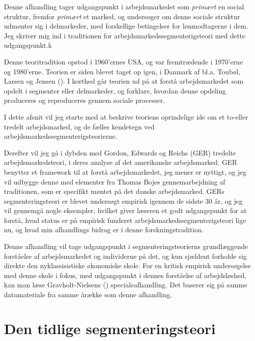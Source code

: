 Denne afhandling tager udgangspunkt i arbejdsmarkedet som \emph{primært} en social struktur, fremfor \emph{primært} et marked, og undersøger om denne sociale struktur udmønter sig i delmarkeder, med forskellige betingelser for lønmodtagerne i dem. Jeg skriver mig ind i traditionen for arbejdsmarkedssegmenterigsteori med dette udgangspunkt.k

Denne teoritradition opstod i 1960'ernes USA, og var fremtrædende i 1970'erne og 1980'erne. Teorien er siden blevet taget op igen, i Danmark af bl.a. Toubøl, Larsen og Jensen (\citeyear{Touboel2013}). I korthed går teorien ud på at forstå arbejdsmarkedet som opdelt i segmenter eller delmarkeder, og forklare, hvordan denne opdeling produceres og reproduceres gennem sociale processer.

I dette afsnit vil jeg starte med at beskrive teoriens oprindelige ide om et to-eller tredelt arbejdsmarked, og de fælles kendetegn ved arbejdsmarkedssegmenterigsteorierne.

Derefter vil jeg gå i dybden med Gordon, Edwards og Reichs (GER) tredelte arbejdsmarkedsteori, i deres analyse af det amerikanske arbejdsmarked. GER benytter et framework til at forstå arbejdsmarkedet, jeg mener er nyttigt, og jeg vil udbygge denne med elementer fra Thomas Bojes gennemarbejdning af traditionen, som er specifikt møntet på det danske arbejdsmarked.
GERs segmenteringsteori er blevet undersøgt empirisk igennem de sidste 30 år, og jeg vil gennemgå nogle eksempler,  hvilket giver læseren et godt udgangspunkt for at forstå, hvad status er på empirisk funderet arbejdsmarkedssegmenterigsteori lige nu, og hvad min afhandlings bidrag er i denne forskningstradition. 

Denne afhandling vil tage udgangspunkt i segmenteringsteorierns grundlæggende forståelse af  arbejdsmarkedet og individerne på det, og kun sjældent forholde sig direkte den nyklassisistiske økonomiske skole. For en kritisk empirisk undersøgelse med denne skole i fokus, med udgangspunkt i dennes forståelse af arbejdsløshed, kan man læse Gravholt-Nielsens (\citeyear{Gravholt-Nielsen2016}) specialeafhandling. Det baserer sig på samme datamateriale fra samme årække som denne afhandling. 


\section{Den tidlige segmenteringsteori \label{AST_overordnet}}

